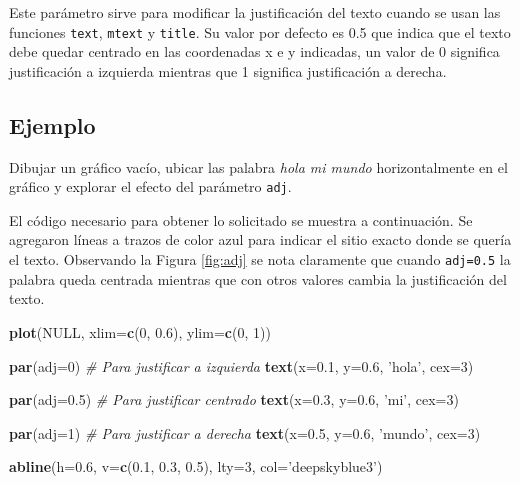 \documentclass[10pt,]{krantz}
\makeatletter
\newenvironment{Shaded}{\begin{snugshade}}{\end{snugshade}}
\newcommand{\KeywordTok}[1]{\textcolor[rgb]{0.13,0.29,0.53}{\textbf{{#1}}}}
\newcommand{\DataTypeTok}[1]{\textcolor[rgb]{0.13,0.29,0.53}{{#1}}}
\newcommand{\DecValTok}[1]{\textcolor[rgb]{0.00,0.00,0.81}{{#1}}}
\newcommand{\FloatTok}[1]{\textcolor[rgb]{0.00,0.00,0.81}{{#1}}}
\newcommand{\StringTok}[1]{\textcolor[rgb]{0.31,0.60,0.02}{{#1}}}
\newcommand{\CommentTok}[1]{\textcolor[rgb]{0.56,0.35,0.01}{\textit{{#1}}}}
\newcommand{\OtherTok}[1]{\textcolor[rgb]{0.56,0.35,0.01}{{#1}}}
\newcommand{\NormalTok}[1]{{#1}}
\newenvironment{kframe}{%
\medskip{}
\setlength{\fboxsep}{.8em}
 \def\at@end@of@kframe{}%
 \ifinner\ifhmode%
  \def\at@end@of@kframe{\end{minipage}}%
  \begin{minipage}{\columnwidth}%
 \fi\fi%
 \def\FrameCommand##1{\hskip\@totalleftmargin \hskip-\fboxsep
 \colorbox{shadecolor}{##1}\hskip-\fboxsep
     \hskip-\linewidth \hskip-\@totalleftmargin \hskip\columnwidth}%
 \MakeFramed {\advance\hsize-\width
   \@totalleftmargin\z@ \linewidth\hsize
   \@setminipage}}%
 {\par\unskip\endMakeFramed%
 \at@end@of@kframe}
\renewenvironment{Shaded}{\begin{kframe}}{\end{kframe}}
\makeatother
\begin{document}
Este parámetro sirve para modificar la justificación del texto cuando se
usan las funciones \texttt{text}, \texttt{mtext} y \texttt{title}. Su
valor por defecto es 0.5 que indica que el texto debe quedar centrado en
las coordenadas x e y indicadas, un valor de 0 significa justificación a
izquierda mientras que 1 significa justificación a derecha.

\subsection*{Ejemplo}\label{ejemplo-23}


Dibujar un gráfico vacío, ubicar las palabra \emph{hola mi mundo}
horizontalmente en el gráfico y explorar el efecto del parámetro
\texttt{adj}.

El código necesario para obtener lo solicitado se muestra a
continuación. Se agregaron líneas a trazos de color azul para indicar el
sitio exacto donde se quería el texto. Observando la Figura
\ref{fig:adj} se nota claramente que cuando \texttt{adj=0.5} la palabra
queda centrada mientras que con otros valores cambia la justificación
del texto.

\begin{Shaded}
\begin{Highlighting}[]
\KeywordTok{plot}\NormalTok{(}\OtherTok{NULL}\NormalTok{, }\DataTypeTok{xlim=}\KeywordTok{c}\NormalTok{(}\DecValTok{0}\NormalTok{, }\FloatTok{0.6}\NormalTok{), }\DataTypeTok{ylim=}\KeywordTok{c}\NormalTok{(}\DecValTok{0}\NormalTok{, }\DecValTok{1}\NormalTok{))}

\KeywordTok{par}\NormalTok{(}\DataTypeTok{adj=}\DecValTok{0}\NormalTok{)  }\CommentTok{# Para justificar a izquierda}
\KeywordTok{text}\NormalTok{(}\DataTypeTok{x=}\FloatTok{0.1}\NormalTok{, }\DataTypeTok{y=}\FloatTok{0.6}\NormalTok{, }\StringTok{'hola'}\NormalTok{, }\DataTypeTok{cex=}\DecValTok{3}\NormalTok{)}

\KeywordTok{par}\NormalTok{(}\DataTypeTok{adj=}\FloatTok{0.5}\NormalTok{)  }\CommentTok{# Para justificar centrado}
\KeywordTok{text}\NormalTok{(}\DataTypeTok{x=}\FloatTok{0.3}\NormalTok{, }\DataTypeTok{y=}\FloatTok{0.6}\NormalTok{, }\StringTok{'mi'}\NormalTok{, }\DataTypeTok{cex=}\DecValTok{3}\NormalTok{)}

\KeywordTok{par}\NormalTok{(}\DataTypeTok{adj=}\DecValTok{1}\NormalTok{)  }\CommentTok{# Para justificar a derecha}
\KeywordTok{text}\NormalTok{(}\DataTypeTok{x=}\FloatTok{0.5}\NormalTok{, }\DataTypeTok{y=}\FloatTok{0.6}\NormalTok{, }\StringTok{'mundo'}\NormalTok{, }\DataTypeTok{cex=}\DecValTok{3}\NormalTok{)}

\KeywordTok{abline}\NormalTok{(}\DataTypeTok{h=}\FloatTok{0.6}\NormalTok{, }\DataTypeTok{v=}\KeywordTok{c}\NormalTok{(}\FloatTok{0.1}\NormalTok{, }\FloatTok{0.3}\NormalTok{, }\FloatTok{0.5}\NormalTok{),}
       \DataTypeTok{lty=}\DecValTok{3}\NormalTok{, }\DataTypeTok{col=}\StringTok{'deepskyblue3'}\NormalTok{)}
\end{Highlighting}
\end{Shaded}
\end{document}
